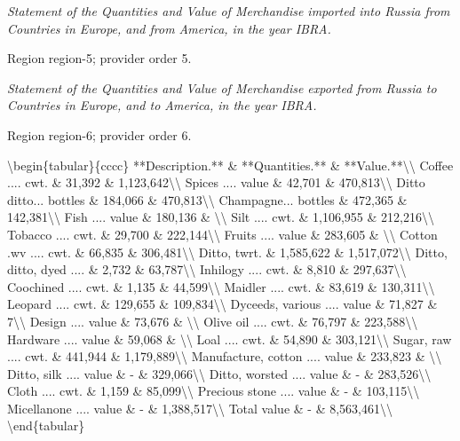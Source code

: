 \documentclass[11pt]{article}
\begin{document}
{\small\itshape Statement of the Quantities and Value of Merchandise imported into Russia from Countries in Europe, and from America, in the year IBRA.\par}

{\scriptsize\color{gray} Region region-5; provider order 5.\par}
\medskip

{\small\itshape Statement of the Quantities and Value of Merchandise exported from Russia to Countries in Europe, and to America, in the year IBRA.\par}

{\scriptsize\color{gray} Region region-6; provider order 6.\par}
\medskip

\textbackslash{}begin\{tabular\}\{cccc\}
**Description.** \& **Quantities.** \& **Value.**\textbackslash{}\textbackslash{}
Coffee .... cwt. \& 31,392 \& 1,123,642\textbackslash{}\textbackslash{}
Spices .... value \& 42,701 \& 470,813\textbackslash{}\textbackslash{}
Ditto ditto... bottles \& 184,066 \& 470,813\textbackslash{}\textbackslash{}
Champagne... bottles \& 472,365 \& 142,381\textbackslash{}\textbackslash{}
Fish .... value \& 180,136 \& \textbackslash{}\textbackslash{}
Silt .... cwt. \& 1,106,955 \& 212,216\textbackslash{}\textbackslash{}
Tobacco .... cwt. \& 29,700 \& 222,144\textbackslash{}\textbackslash{}
Fruits .... value \& 283,605 \& \textbackslash{}\textbackslash{}
Cotton .wv .... cwt. \& 66,835 \& 306,481\textbackslash{}\textbackslash{}
Ditto, twrt. \& 1,585,622 \& 1,517,072\textbackslash{}\textbackslash{}
Ditto, ditto, dyed .... \& 2,732 \& 63,787\textbackslash{}\textbackslash{}
Inhilogy .... cwt. \& 8,810 \& 297,637\textbackslash{}\textbackslash{}
Coochined .... cwt. \& 1,135 \& 44,599\textbackslash{}\textbackslash{}
Maidler .... cwt. \& 83,619 \& 130,311\textbackslash{}\textbackslash{}
Leopard .... cwt. \& 129,655 \& 109,834\textbackslash{}\textbackslash{}
Dyceeds, various .... value \& 71,827 \& 7\textbackslash{}\textbackslash{}
Design .... value \& 73,676 \& \textbackslash{}\textbackslash{}
Olive oil .... cwt. \& 76,797 \& 223,588\textbackslash{}\textbackslash{}
Hardware .... value \& 59,068 \& \textbackslash{}\textbackslash{}
Loal .... cwt. \& 54,890 \& 303,121\textbackslash{}\textbackslash{}
Sugar, raw .... cwt. \& 441,944 \& 1,179,889\textbackslash{}\textbackslash{}
Manufacture, cotton .... value \& 233,823 \& \textbackslash{}\textbackslash{}
Ditto, silk .... value \& - \& 329,066\textbackslash{}\textbackslash{}
Ditto, worsted .... value \& - \& 283,526\textbackslash{}\textbackslash{}
Cloth .... cwt. \& 1,159 \& 85,099\textbackslash{}\textbackslash{}
Precious stone .... value \& - \& 103,115\textbackslash{}\textbackslash{}
Micellanone .... value \& - \& 1,388,517\textbackslash{}\textbackslash{}
Total value \& - \& 8,563,461\textbackslash{}\textbackslash{}
\textbackslash{}end\{tabular\}
\par
\end{document}
